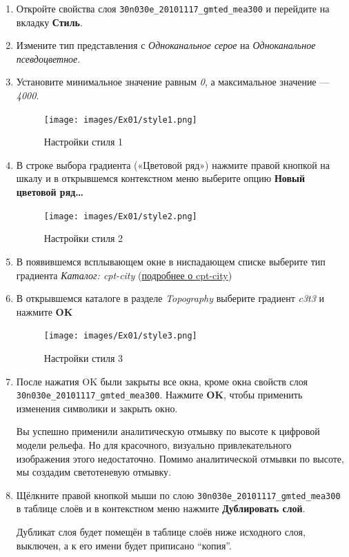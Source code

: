 \documentclass[
  12pt,
]{book}
\begin{document}
\begin{enumerate}
\def\labelenumi{\arabic{enumi}.}
\item
  Откройте свойства слоя \texttt{30n030e\_20101117\_gmted\_mea300} и перейдите на вкладку \textbf{Стиль}.
\item
  Измените тип представления с \emph{Одноканальное серое} на \emph{Одноканальное псевдоцветное}.
\item
  Установите минимальное значение равным \emph{0}, а максимальное значение --- \emph{4000}.

  \begin{figure}
  \centering
  \texttt{[image: images/Ex01/style1.png]}
  \caption{Настройки стиля 1}
  \end{figure}
\item
  В строке выбора градиента («Цветовой ряд») нажмите правой кнопкой на шкалу и в открывшемся контекстном меню выберите опцию \textbf{Новый цветовой ряд\ldots{}}

  \begin{figure}
  \centering
  \texttt{[image: images/Ex01/style2.png]}
  \caption{Настройки стиля 2}
  \end{figure}
\item
  В появившемся всплывающем окне в ниспадающем списке выберите тип градиента \emph{Каталог: cpt-city} (\href{http://soliton.vm.bytemark.co.uk/pub/cpt-city/}{подробнее о cpt-city})
\item
  В открывшемся каталоге в разделе \emph{Topography} выберите градиент \emph{c3t3} и нажмите \textbf{OK}

  \begin{figure}
  \centering
  \texttt{[image: images/Ex01/style3.png]}
  \caption{Настройки стиля 3}
  \end{figure}
\item
  После нажатия OK были закрыты все окна, кроме окна свойств слоя \texttt{30n030e\_20101117\_gmted\_mea300}. Нажмите \textbf{OK}, чтобы применить изменения символики и закрыть окно.

  Вы успешно применили аналитическую отмывку по высоте к цифровой модели рельефа. Но для красочного, визуально привлекательного изображения этого недостаточно. Помимо аналитической отмывки по высоте, мы создадим светотеневую отмывку.
\item
  Щёлкните правой кнопкой мыши по слою \texttt{30n030e\_20101117\_gmted\_mea300} в таблице слоёв и в контекстном меню нажмите \textbf{Дублировать слой}.

  Дубликат слоя будет помещён в таблице слоёв ниже исходного слоя, выключен, а к его имени будет приписано ``копия''.


\end{enumerate}
\end{document}
